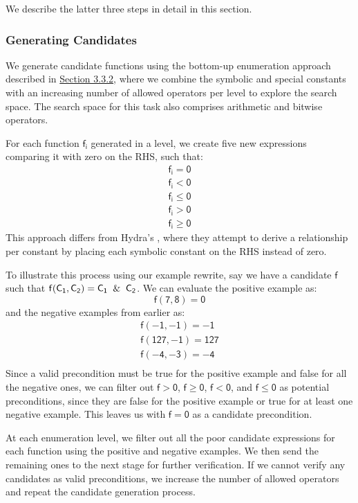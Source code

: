 \documentclass[review, anonymous, acmsmall]{acmart}
\newcommand{\blockmath}[1]{\[\mathsf{#1}\]}
\newcommand{\inline}[1]{$\mathsf{#1}$}
\begin{document}
We describe the latter three steps in detail in this section. 

\subsubsection{Generating Candidates}
We generate candidate functions using the bottom-up enumeration approach described in \hyperref[enumerative]{Section 3.3.2}, where we combine the symbolic and special constants with an increasing number of allowed operators per level to explore the search space. The search space for this task also comprises arithmetic and bitwise operators. 

For each function \inline{f_i} generated in a level, we create five new expressions comparing it with zero on the RHS, such that:
\begin{align*} 
\mathsf{f_i = 0} \\
\mathsf{f_i < 0} \\
\mathsf{f_i  \leq 0} \\
\mathsf{f_i > 0} \\
\mathsf{f_i \geq 0}
\end{align*}
This approach differs from Hydra's \cite{mukherjee_hydra_2024}, where they attempt to derive a relationship per constant by placing each symbolic constant on the RHS instead of zero.

To illustrate this process using our example rewrite, say we have a candidate \inline{f} such that \inline{f(C_1, C_2) = C_1 \And C_2}. We can evaluate the positive example as:
\blockmath{f(7, 8) = 0}
and the negative examples from earlier as:
\begin{align*} 
\mathsf{f(-1,-1) = -1} \\
\mathsf{f(127,-1) = 127} \\
\mathsf{f(-4,-3) = -4} \\
\end{align*}
Since a valid precondition must be true for the positive example and false for all the negative ones, we can filter out \inline{f > 0}, \inline{f \geq 0}, \inline{f < 0}, and \inline{f \leq 0} as potential preconditions, since they are false for the positive example or true for at least one negative example. This leaves us with \inline{f = 0} as a candidate precondition. 

At each enumeration level, we filter out all the poor candidate expressions for each function using the positive and negative examples. We then send the remaining ones to the next stage for further verification. If we cannot verify any candidates as valid preconditions, we increase the number of allowed operators and repeat the candidate generation process. 
\end{document}
